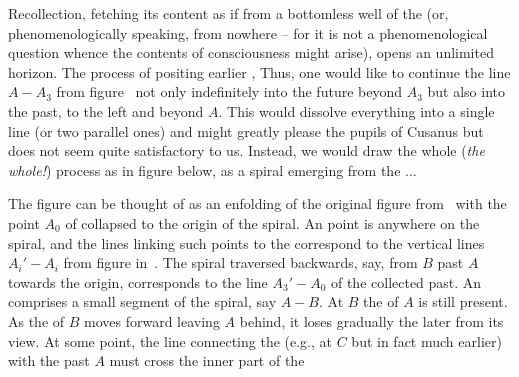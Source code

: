 Recollection, fetching its content as if from a bottomless well of the  (or, phenomenologically speaking, from nowhere -- for it is not a
phenomenological question whence the contents of consciousness might arise),
opens an unlimited horizon.  The process of positing earlier ,  Thus, one would like
to continue the line $A-A_3$ from figure~ not only
indefinitely into the future beyond $A_3$ but also into the past, to the left
and beyond $A$. This would dissolve
everything into a single line (or two parallel ones) and might greatly please
the pupils of Cusanus but does not seem quite satisfactory to us.  Instead, we
would draw the whole ({\em the whole!})  process as in figure below,
as a spiral emerging from the ...
\begin{center}
\epsfxsize=6cm
\end{center}\label{fig:onetime}  
The figure can be thought of as an enfolding of the original figure
from~ 
with the point $A_0$ of  collapsed to the origin of the
spiral.
An  point is anywhere on the spiral, and the lines linking such points
to the  correspond to the vertical lines $A_i'-A_i$ from
figure in~. The spiral traversed backwards, say, from $B$ past
$A$ towards the origin, corresponds to the line $A_3'-A_0$ of the collected
past. An  comprises a small segment of the spiral, say
$A-B$. At $B$ the  of $A$ is still present.
As the  of $B$ moves forward leaving $A$ behind, it loses gradually the
later from its view. At some point, the line connecting the  (e.g., at
$C$ but in fact much earlier) with the past $A$ must cross the inner part of the
